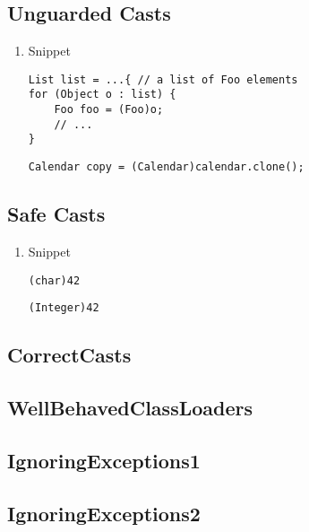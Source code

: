 \documentclass{usiinfdocprop}
\begin{document}
\subsection{Unguarded Casts}
\label{sec:org48fe1a5}
\begin{enumerate}
\item Snippet
\label{sec:org1746101}

\lstset{language=java,label= ,caption= ,captionpos=b,numbers=none}
\begin{lstlisting}
List list = ...{ // a list of Foo elements
for (Object o : list) {
    Foo foo = (Foo)o;
    // ...
}
\end{lstlisting}

\lstset{language=java,label= ,caption= ,captionpos=b,numbers=none}
\begin{lstlisting}
Calendar copy = (Calendar)calendar.clone();
\end{lstlisting}
\end{enumerate}

\subsection{Safe Casts}
\label{sec:orgb0b57ed}
\begin{enumerate}
\item Snippet
\label{sec:org3fc2f88}

\lstset{language=java,label= ,caption= ,captionpos=b,numbers=none}
\begin{lstlisting}
(char)42
\end{lstlisting}

\lstset{language=java,label= ,caption= ,captionpos=b,numbers=none}
\begin{lstlisting}
(Integer)42
\end{lstlisting}
\end{enumerate}

\subsection{CorrectCasts}
\label{sec:org3482398}
\subsection{WellBehavedClassLoaders}
\label{sec:org6994626}
\subsection{IgnoringExceptions1}
\label{sec:org644b1d5}
\subsection{IgnoringExceptions2}
\label{sec:orgd533c15}
\end{document}
